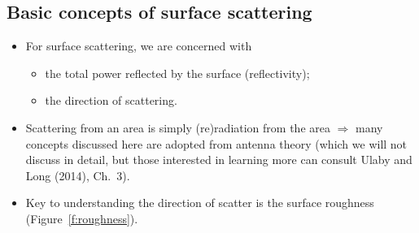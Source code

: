 \documentclass[11pt, oneside]{article}
\begin{document}
\subsection{Basic concepts of surface scattering}

\begin{itemize}
	\item For surface scattering, we are concerned with
	\begin{itemize}
		\item the total power reflected by the surface (reflectivity);
		\item the direction of scattering.
	\end{itemize}
	\item Scattering from an area is simply (re)radiation from the area $\Rightarrow$ many concepts discussed here are adopted from antenna theory (which we will not discuss in detail, but those interested in learning more can consult Ulaby and Long (2014), Ch.~3).
	\item Key to understanding the direction of scatter is the surface roughness (Figure~\ref{f:roughness}).
\end{itemize}
\end{document}
